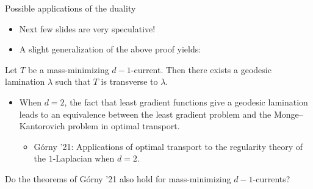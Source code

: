 \documentclass[10pt]{beamer}
\begin{document}
\begin{frame}{Possible applications of the duality}
\begin{itemize}
\item Next few slides are very speculative! \pause
\item A slight generalization of the above proof yields:
\end{itemize}

\begin{theorem}
Let $T$ be a mass-minimizing $d - 1$-current.
Then there exists a geodesic lamination $\lambda$ such that $T$ is transverse to $\lambda$. \pause
\end{theorem}

\begin{itemize}
\item When $d = 2$, the fact that least gradient functions give a geodesic lamination leads to an equivalence between the least gradient problem and the Monge--Kantorovich problem in optimal transport.
\begin{itemize}
\item G\'orny '21: Applications of optimal transport to the regularity theory of the $1$-Laplacian when $d = 2$. \pause
\end{itemize}
\end{itemize}

\begin{problem}
Do the theorems of G\'orny '21 also hold for mass-minimizing $d - 1$-currents?
\end{problem}
\end{frame}
\end{document}
